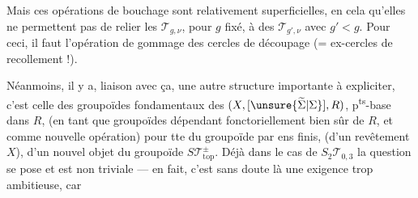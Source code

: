 Mais ces opérations de bouchage sont relativement superficielles, en cela qu'elles ne permettent pas de relier les $\mathcal T_{g,\nu}$, pour $g$ fixé, à des $\mathcal T_{g',\nu}$ avec $g'<g$. Pour ceci, il faut l'opération  de gommage des cercles de découpage (= ex-cercles de recollement !).

Néanmoins, il y a,   liaison avec ça, une autre structure importante à expliciter, c'est celle des  groupoïdes fondamentaux  des $(X,[\unsure{\widetilde{\Sigma}|\Sigma}],R)$, p\textsuperscript{ts}-base dans $R$,  (en tant que groupoïdes dépendant fonctoriellement bien sûr de $R$, et  comme nouvelle opération) pour tte   du groupoïde par ens finis, \inserted{[\unsure{définissant|définition} \unsure{un|du}} (d'un revêtement   $X$), d'un nouvel objet du  groupoïde $S\mathcal T_{\mathrm{top}}^\pm$. Déjà dans le cas de $S_2\mathcal T_{0,3}$ la question se pose et est non triviale --- en fait, c'est sans doute là une exigence trop ambitieuse, car

